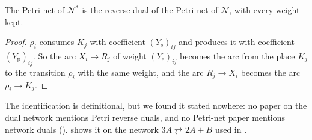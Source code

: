 \documentclass[11pt,a4paper]{report}
\newcommand{\Net}{\mathcal{N}}
\newcommand{\Nd}{\mathcal{N}^{*}}
\newcommand{\Ye}{Y_{\mathrm e}}
\newcommand{\Yp}{Y_{\mathrm p}}
\begin{document}
\begin{proposition}\label{prop:revdual}
The Petri net of \(\Nd\) is the reverse dual of the Petri net of \(\Net\), with every weight kept.
\end{proposition}
\begin{proof}
\(\rho_i\) consumes \(K_j\) with coefficient \((\Ye)_{ij}\) and produces it with coefficient \((\Yp)_{ij}\). So the
arc \(X_i\to R_j\) of weight \((\Ye)_{ij}\) becomes the arc from the place \(K_j\) to the transition \(\rho_i\) with
the same weight, and the arc \(R_j\to X_i\) becomes the arc \(\rho_i\to K_j\).
\end{proof}

The identification is definitional, but we found it stated nowhere: no paper on the dual network mentions Petri
reverse duals, and no Petri-net paper mentions network duals ().  shows it on
the network \(3A\rightleftarrows2A+B\) used in .
\end{document}
